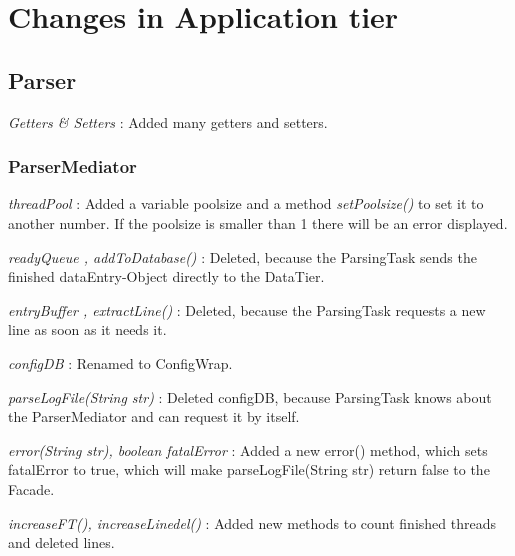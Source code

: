 \section{Changes in Application tier}

\subsection{Parser}

\textit{Getters & Setters} : Added many getters and setters.

\subsubsection{ParserMediator}

\textit{threadPool} : Added a variable poolsize and a method \textit{setPoolsize()} to set it to another number. 
If the poolsize is smaller than 1 there will be an error displayed. \newline\newline

\textit{readyQueue , addToDatabase()} : Deleted, because the ParsingTask sends the finished dataEntry-Object directly to the DataTier.
\newline\newline

\textit{entryBuffer , extractLine()} : Deleted, because the ParsingTask requests a new line as soon as it needs it.\newline\newline

\textit{configDB} : Renamed to ConfigWrap.\newline\newline

\textit{parseLogFile(String str)} : Deleted configDB, because ParsingTask knows about the ParserMediator and can request it by itself.
\newline\newline

\textit{error(String str), boolean fatalError} : Added a new error() method, which sets fatalError to true, which will 
make parseLogFile(String str) return false to the Facade.\newline\newline

\textit{increaseFT(), increaseLinedel()} : Added new methods to count finished threads and deleted lines. \newline\newline


